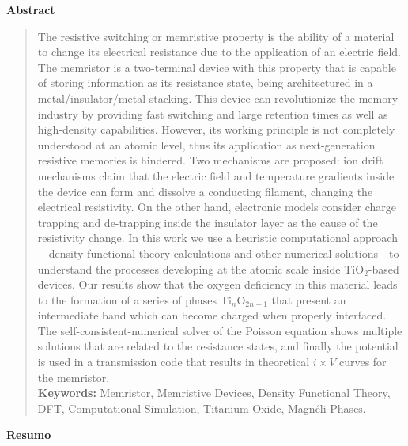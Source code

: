 
\newpage
\centerline{\large \textbf{Abstract}}


\begin{quote}
The resistive switching or memristive property is the ability of a material to change its electrical resistance due to the application of an electric field. The memristor is a two-terminal device with this property that is capable of storing information as its resistance state, being architectured in a metal/insulator/metal stacking. This device can revolutionize the memory industry by providing fast switching and large retention times as well as high-density capabilities. However, its working principle is not completely understood at an atomic level, thus its application as next-generation resistive memories is hindered. Two mechanisms are proposed: ion drift mechanisms claim that the electric field and temperature gradients inside the device can form and dissolve a conducting filament, changing the electrical resistivity. On the other hand, electronic models consider charge trapping and de-trapping inside the insulator layer as the cause of the resistivity change. In this work we use a heuristic computational approach---density functional theory calculations and other numerical solutions---to understand the processes developing at the atomic scale inside TiO$_2$-based devices. Our results show that the oxygen deficiency in this material leads to the formation of a series of phases Ti$_n$O$_{2n-1}$ that present an intermediate band which can become charged when properly interfaced. The self-consistent-numerical solver of the Poisson equation shows multiple solutions that are related to the resistance states, and finally the potential is used in a transmission code that results in theoretical $i \times V$ curves for the memristor. \\ \textbf{Keywords:} Memristor, Memristive Devices, Density Functional Theory, DFT, Computational Simulation, Titanium Oxide, Magnéli Phases.
\end{quote}

\newpage

\centerline{\large \textbf{Resumo}}

